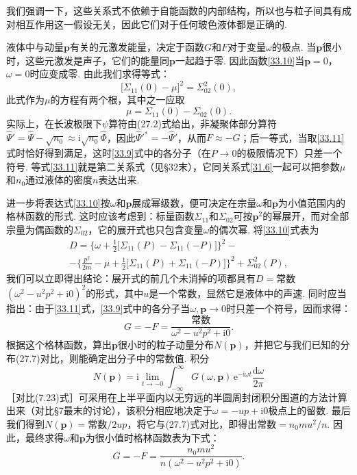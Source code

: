 我们强调一下，这些关系式不依赖于自能函数的内部结构，所以也与粒子间具有成对相互作用这一假设无关，因此它们对于任何玻色液体都是正确的.

液体中与动量$\bm{p}$有关的元激发能量，决定于函数$G$和$F$对于变量$\omega$的极点. 当$\bm{p}$很小时，这些元激发是声子，它们的能量同$\bm{p}$一起趋于零. 因此函数\eqref{33.10}当$\bm{p}=0$，$\omega=0$时应变成零. 由此我们求得等式：
\begin{equation*}
\big[\Sigma_{11}(0)-\mu\big]^{2}=\Sigma_{02}^{2}(0),
\end{equation*}
此式作为$\mu$的方程有两个根，其中之一应取
\begin{equation}
\mu=\Sigma_{11}(0)-\Sigma_{02}(0).
\label{33.11}
\end{equation}
实际上，在长波极限下$\psi$算符由(27.2)式给出，非凝聚体部分算符$\hat{\Psi}'=\hat{\Psi}-\sqrt{n_{0}}\approx\mathrm{i}\sqrt{n_{0}}\hat{\Phi}$，因此$\hat{\Psi}'^{*}=-\hat{\Psi}'$，从而$F\approx-G$；后一等式，当取\eqref{33.11}式时恰好得到满足，这时\eqref{33.9}式中的各分子（在$P\to0$的极限情况下）只差一个符号. 等式\eqref{33.11}就是第二关系式（见§32末），它同关系式\eqref{31.6}一起可以把参数$\mu$和$n_{0}$通过液体的密度$n$表达出来.

进一步将表达式\eqref{33.10}按$\omega$和$\bm{p}$展成幂级数，便可决定在宗量$\omega$和$\bm{p}$为小值范围内的格林函数的形式. 这时应该考虑到：标量函数$\Sigma_{11}$和$\Sigma_{02}$可按$\bm{p}^{2}$的幂展开，而对全部宗量为偶函数的$\Sigma_{02}$，它的展开式也只包含变量$\omega$的偶次幂. 将\eqref{33.10}式表为
\begin{equation*}
\begin{aligned}
D=\Big\{\omega+\frac{1}{2}\big[\Sigma_{11}(P)-\Sigma_{11}(-P)\big]\Big\}^{2}-{}\\
-\Big\{\frac{p^{2}}{2m}-\mu+\frac{1}{2}\big[\Sigma_{11}(P)+\Sigma_{11}(-P)\big]\Big\}^{2}
+\Sigma_{02}^{2}(P),
\end{aligned}
\end{equation*}
我们可以立即得出结论：展开式的前几个未消掉的项都具有$D=$常数$(\omega^{2}-u^{2}p^{2}+\mathrm{i}0)^{2}$的形式，其中$u$是一个常数，显然它是液体中的声速. 同时应当指出：由于\eqref{33.11}式，\eqref{33.9}式中的各分子当$\omega,\bm{p}\to0$时只差一个符号，因而求得：
\begin{equation*}
G=-F=\frac{\text{常数}}{\omega^{2}-u^{2}p^{2}+\mathrm{i}0}.
\end{equation*}
根据这个格林函数，算出$\bm{p}$很小时的粒子动量分布$N(\bm{p})$，并把它与我们已知的分布(27.7)对比，则能确定出分子中的常数值. 积分
\begin{equation*}
N(\bm{p})=\mathrm{i}\lim_{t\to-0}\int_{-\infty}^{\infty}G(\omega,\bm{p})\,\mathrm{e}^{-\mathrm{i}\omega t}\frac{\mathrm{d}\omega}{2\pi}
\end{equation*}
［对比(7.23)式］可采用在上半平面内以无穷远的半圆周封闭积分围道的方法计算出来（对比§7最末的讨论），该积分相应地决定于$\omega=-up+\mathrm{i}0$极点上的留数. 最后我们得到$N(\bm{p})=$常数$/2up$，将它与(27.7)式对比，即得出常数$=n_{0}mu^{2}/n$. 因此，最终求得$\omega$和$\bm{p}$为很小值时格林函数表为下式：
\begin{equation}
G=-F=\frac{n_{0}mu^{2}}{n(\omega^{2}-u^{2}p^{2}+\mathrm{i}0)}.
\label{33.12}
\end{equation}

